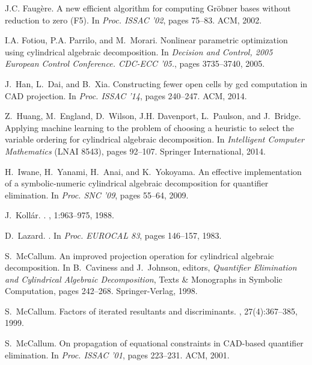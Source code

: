 \documentclass{llncs}
\begin{document}
\begin{thebibliography}{10}
J.C. Faug\`{e}re.
\newblock A new efficient algorithm for computing {G}r\"{o}bner bases without
  reduction to zero ({F}5).
\newblock In {\em Proc. ISSAC '02}, pages 75--83. ACM,
  2002.

I.A. Fotiou, P.A. Parrilo, and M.~Morari.
\newblock Nonlinear parametric optimization using cylindrical algebraic
  decomposition.
\newblock In {\em Decision and Control, 2005 European Control Conference.
  CDC-ECC '05.}, pages 3735--3740, 2005.

J.~Han, L.~Dai, and B.~Xia.
\newblock Constructing fewer open cells by gcd computation in {CAD} projection.
\newblock In {\em Proc. ISSAC '14}, pages 240--247. ACM,
  2014.

Z.~Huang, M.~England, D.~Wilson, J.H. Davenport, L.~Paulson, and J.~Bridge.
\newblock Applying machine learning to the problem of choosing a heuristic to
  select the variable ordering for cylindrical algebraic decomposition.
\newblock In {\em Intelligent Computer Mathematics} (LNAI 8543), pages 92--107. Springer International,
  2014.

H.~Iwane, H.~Yanami, H.~Anai, and K.~Yokoyama.
\newblock An effective implementation of a symbolic-numeric cylindrical
  algebraic decomposition for quantifier elimination.
\newblock In {\em Proc. SNC '09}, pages 55--64, 2009.

J.~Koll\'ar.
.
, 1:963--975, 1988.

D.~Lazard.
.
\newblock In {\em Proc. EUROCAL 83}, pages 146--157, 1983.

S.~McCallum.
\newblock An improved projection operation for cylindrical algebraic
  decomposition.
\newblock In B.~Caviness and J.~Johnson, editors, {\em Quantifier Elimination
  and Cylindrical Algebraic Decomposition}, Texts \& Monographs in Symbolic
  Computation, pages 242--268. Springer-Verlag, 1998.

S.~McCallum.
\newblock Factors of iterated resultants and discriminants.
, 27(4):367--385, 1999.

S.~McCallum.
\newblock On propagation of equational constraints in {CAD}-based quantifier
  elimination.
\newblock In {\em Proc. ISSAC '01}, pages 223--231. ACM,
  2001.


\end{thebibliography}
\end{document}
